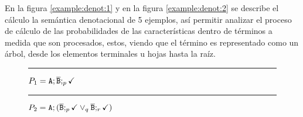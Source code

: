 En la figura \ref{example:denot:1} y en
la figura \ref{example:denot:2} se describe
el cálculo la semántica denotacional de 5 ejemplos,
así permitir analizar el proceso de cálculo de 
las probabilidades de las características dentro de
términos a medida que son procesados, estos,
viendo que el término es representado como un árbol,
desde los elementos terminales u hojas hasta la raíz. 




\begin{figure}[h]
	\hrule
	
	\vspace*{1em}
	
	\centering $P_{1} = \mathtt{A};\overline{\mathtt{B}};_{p}\checkmark$\review
	
	
	\vspace*{1em} \hrule\vspace*{1em}
	
	
	\centering 
	$P_{2} = \mathtt{A};(\overline{\mathtt{B}};_{p}\checkmark \mathbin{\lor}_{q} \overline{\mathtt{B}};_{r}\checkmark)$ \review
	

\end{figure}
